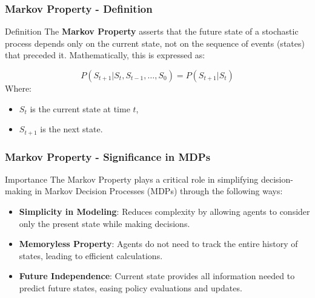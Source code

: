 \documentclass[aspectratio=169]{beamer}
\begin{document}
\begin{frame}[fragile]
    \frametitle{Markov Property - Definition}
    \begin{block}{Definition}
        The \textbf{Markov Property} asserts that the future state of a stochastic process depends only on the current state, not on the sequence of events (states) that preceded it. Mathematically, this is expressed as:
    \end{block}
    \begin{equation}
        P(S_{t+1} | S_t, S_{t-1}, \ldots, S_0) = P(S_{t+1} | S_t)
    \end{equation}
    Where:
    \begin{itemize}
        \item \( S_t \) is the current state at time \( t \),
        \item \( S_{t+1} \) is the next state.
    \end{itemize}
\end{frame}

\begin{frame}[fragile]
    \frametitle{Markov Property - Significance in MDPs}
    \begin{block}{Importance}
        The Markov Property plays a critical role in simplifying decision-making in Markov Decision Processes (MDPs) through the following ways:
    \end{block}
    \begin{itemize}
        \item \textbf{Simplicity in Modeling}: Reduces complexity by allowing agents to consider only the present state while making decisions.
        \item \textbf{Memoryless Property}: Agents do not need to track the entire history of states, leading to efficient calculations.
        \item \textbf{Future Independence}: Current state provides all information needed to predict future states, easing policy evaluations and updates.
    \end{itemize}
\end{frame}
\end{document}
